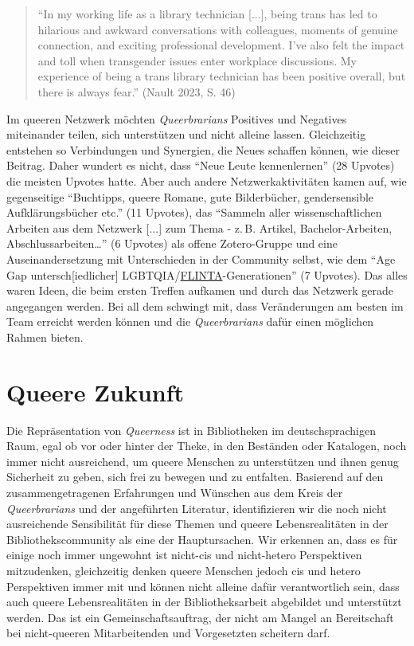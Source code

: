 \documentclass[a4paper,
fontsize=11pt,
oneside,
numbers=noperiodatend,
parskip=half-,
bibliography=totoc,
final
]{scrartcl}
\begin{document}
\begin{quote}
\enquote{In my working life as a library technician {[}...{]}, being
trans has led to hilarious and awkward conversations with colleagues,
moments of genuine connection, and exciting professional development.
I've also felt the impact and toll when transgender issues enter
workplace discussions. My experience of being a trans library technician
has been positive overall, but there is always fear.} (Nault 2023, S.
46)
\end{quote}

Im queeren Netzwerk möchten \emph{Queerbrarians} Positives und Negatives
miteinander teilen, sich unterstützen und nicht alleine lassen.
Gleichzeitig entstehen so Verbindungen und Synergien, die Neues schaffen
können, wie dieser Beitrag. Daher wundert es nicht, dass \enquote{Neue
Leute kennenlernen} (28 Upvotes) die meisten Upvotes hatte. Aber auch
andere Netzwerkaktivitäten kamen auf, wie gegenseitige
\enquote{Buchtipps, queere Romane, gute Bilderbücher, gendersensible
Aufklärungsbücher etc.} (11 Upvotes), das \enquote{Sammeln aller
wissenschaftlichen Arbeiten aus dem Netzwerk {[}...{]} zum Thema - z.\,B.
Artikel, Bachelor-Arbeiten, Abschlussarbeiten\ldots{}} (6 Upvotes) als
offene Zotero-Gruppe und eine Auseinandersetzung mit Unterschieden in
der Community selbst, wie dem \enquote{Age Gap untersch{[}iedlicher{]}
LGBTQIA/\href{https://queer-lexikon.net/2020/05/30/flint/}{FLINTA}-Generationen}
(7 Upvotes). Das alles waren Ideen, die beim ersten Treffen aufkamen und
durch das Netzwerk gerade angegangen werden. Bei all dem schwingt mit,
dass Veränderungen am besten im Team erreicht werden können und die
\emph{Queerbrarians} dafür einen möglichen Rahmen bieten.

\section{Queere Zukunft}\label{queere-zukunft}

Die Repräsentation von \emph{Queerness} ist in Bibliotheken im
deutschsprachigen Raum, egal ob vor oder hinter der Theke, in den
Beständen oder Katalogen, noch immer nicht ausreichend, um queere
Menschen zu unterstützen und ihnen genug Sicherheit zu geben, sich frei
zu bewegen und zu entfalten. Basierend auf den zusammengetragenen
Erfahrungen und Wünschen aus dem Kreis der \emph{Queerbrarians} und der
angeführten Literatur, identifizieren wir die noch nicht ausreichende
Sensibilität für diese Themen und queere Lebensrealitäten in der
Bibliothekscommunity als eine der Hauptursachen. Wir erkennen an, dass
es für einige noch immer ungewohnt ist nicht-cis und nicht-hetero
Perspektiven mitzudenken, gleichzeitig denken queere Menschen jedoch cis
und hetero Perspektiven immer mit und können nicht alleine dafür
verantwortlich sein, dass auch queere Lebensrealitäten in der
Bibliotheksarbeit abgebildet und unterstützt werden. Das ist ein
Gemeinschaftsauftrag, der nicht am Mangel an Bereitschaft bei
nicht-queeren Mitarbeitenden und Vorgesetzten scheitern darf.
\end{document}
